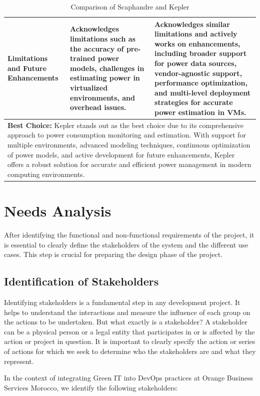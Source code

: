 \begin{table}[htbp]
\begin{tabular}{|p{3cm}|p{6cm}|p{6cm}|}
  \hline
  Limitations and Future Enhancements & Acknowledges limitations such as the accuracy of pre-trained power models, challenges in estimating power in virtualized environments, and overhead issues. & Acknowledges similar limitations and actively works on enhancements, including broader support for power data sources, vendor-agnostic support, performance optimization, and multi-level deployment strategies for accurate power estimation in VMs. \\
  \hline
  \multicolumn{3}{|p{15cm}|}{\textbf{Best Choice:} Kepler stands out as the best choice due to its comprehensive approach to power consumption monitoring and estimation. With support for multiple environments, advanced modeling techniques, continuous optimization of power models, and active development for future enhancements, Kepler offers a robust solution for accurate and efficient power management in modern computing environments.} \\
  \hline
  \end{tabular}
  \caption{Comparison of Scaphandre and Kepler}
  \label{tab:comparison}
  \end{table}

\newpage
\section{Needs Analysis}
\label{sec:needs_analysis}

After identifying the functional and non-functional requirements of the project, it is essential to clearly define the stakeholders of the system and the different use cases. This step is crucial for preparing the design phase of the project.

\subsection{Identification of Stakeholders}
\label{subsec:identification_stakeholders}

Identifying stakeholders is a fundamental step in any development project. It helps to understand the interactions and measure the influence of each group on the actions to be undertaken. But what exactly is a stakeholder? A stakeholder can be a physical person or a legal entity that participates in or is affected by the action or project in question. It is important to clearly specify the action or series of actions for which we seek to determine who the stakeholders are and what they represent.

In the context of integrating Green IT into DevOps practices at Orange Business Services Morocco, we identify the following stakeholders:

